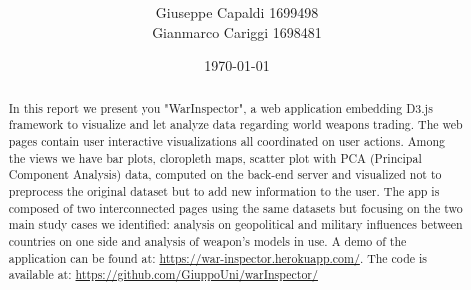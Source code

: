\documentclass{article}
\title{\vspace{-2.0cm}\spacecaps{WarInspector: Visual Analytics web application on Arms Transfer}\\ \normalsize \spacesc{Visual Analytics Course - Sapienza University of Rome} }
\author{Giuseppe Capaldi 1699498\\ Gianmarco Cariggi 1698481}
\date{\today}
\begin{document}
\maketitle
\begin{abstract}

In this report we present you "WarInspector", a web application embedding D3.js framework to visualize and let analyze data regarding world weapons trading. The web pages contain user interactive visualizations all coordinated on user actions. Among the views we have bar plots, cloropleth maps, scatter plot with PCA (Principal Component Analysis) data, computed on the back-end server and visualized not to preprocess the original dataset but to add new information to the user. The app is composed of two interconnected pages using the same datasets but focusing on the two main study cases we identified:  analysis on geopolitical and military influences between countries on one side and analysis of weapon's models in use. A demo of the application can be found at:
\url{https://war-inspector.herokuapp.com/}. The code is available at: \url{https://github.com/GiuppoUni/warInspector/}
%
\end{abstract}
\end{document}
